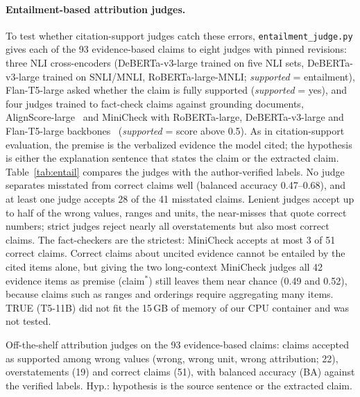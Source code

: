 \paragraph{Entailment-based attribution judges.}
To test whether citation-support judges catch these errors, \texttt{entailment\_judge.py} gives each of the 93 evidence-based claims to eight judges with pinned revisions: three NLI cross-encoders (DeBERTa-v3-large trained on five NLI sets, DeBERTa-v3-large trained on SNLI/MNLI, RoBERTa-large-MNLI; \emph{supported} = entailment), Flan-T5-large asked whether the claim is fully supported (\emph{supported} = yes), and four judges trained to fact-check claims against grounding documents, AlignScore-large~\cite{Zha2023AlignScore} and MiniCheck with RoBERTa-large, DeBERTa-v3-large and Flan-T5-large backbones~\cite{Tang2024MiniCheck} (\emph{supported} = score above 0.5). As in citation-support evaluation, the premise is the verbalized evidence the model cited; the hypothesis is either the explanation sentence that states the claim or the extracted claim. Table~\ref{tab:entail} compares the judges with the author-verified labels. No judge separates misstated from correct claims well (balanced accuracy 0.47--0.68), and at least one judge accepts 28 of the 41 misstated claims. Lenient judges accept up to half of the wrong values, ranges and units, the near-misses that quote correct numbers; strict judges reject nearly all overstatements but also most correct claims. The fact-checkers are the strictest: MiniCheck accepts at most 3 of 51 correct claims. Correct claims about uncited evidence cannot be entailed by the cited items alone, but giving the two long-context MiniCheck judges all 42 evidence items as premise (claim$^*$) still leaves them near chance (0.49 and 0.52), because claims such as ranges and orderings require aggregating many items. TRUE (T5-11B) did not fit the 15\,GB of memory of our CPU container and was not tested.

\begin{table}[h]
\centering\footnotesize\setlength{\tabcolsep}{3pt}
\caption{Off-the-shelf attribution judges on the 93 evidence-based claims: claims accepted as supported among wrong values (wrong, wrong unit, wrong attribution; 22), overstatements (19) and correct claims (51), with balanced accuracy (BA) against the verified labels. Hyp.: hypothesis is the source sentence or the extracted claim.}
\label{tab:entail}
\begin{adjustbox}{max width=\columnwidth}

\end{adjustbox}
\end{table}

